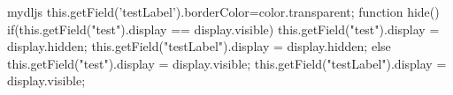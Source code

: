 \usepackage{hyperref}
\usepackage{calc}
\usepackage[pdftex]{insdljs}

\newlength{\mylen}
\settowidth{\mylen}{Enter name: }


\begin{insDLJS}{mydljs}{ }
    this.getField('testLabel').borderColor=color.transparent;
function hide(){
     if(this.getField("test").display == display.visible){
          this.getField("test").display = display.hidden;
          this.getField("testLabel").display = display.hidden;
     } else{
         this.getField("test").display = display.visible;
         this.getField("testLabel").display = display.visible;
     }
}
\end{insDLJS}

\begin{Form}
\TextField[name=testLabel,value=Enter name:,width=\mylen,readonly]{} %
\TextField[name=test]{} \\
\\[0.2cm]
\end{Form}
